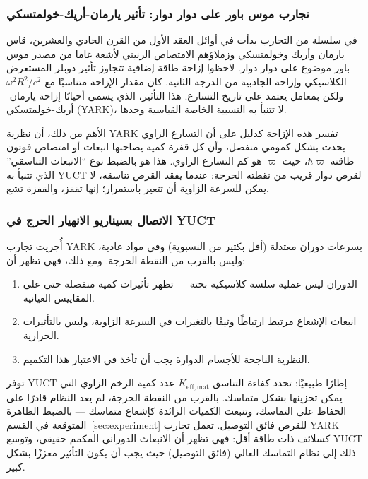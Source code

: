 \documentclass[12pt,a4paper]{article}
\begin{document}
	\subsubsection{تجارب موس باور على دوار دوار: تأثير يارمان-أريك-خولمتسكي}
	
	في سلسلة من التجارب بدأت في أوائل العقد الأول من القرن الحادي والعشرين، قاس يارمان وأريك وخولمتسكي وزملاؤهم الامتصاص الرنيني لأشعة غاما من مصدر موس باور موضوع على دوار دوار. لاحظوا إزاحة طاقة إضافية تتجاوز تأثير دوبلر المستعرض الكلاسيكي وإزاحة الجاذبية من الدرجة الثانية. كان مقدار الإزاحة متناسبًا مع \(\omega^2 R^2 / c^2\) ولكن بمعامل يعتمد على تاريخ التسارع. هذا التأثير، الذي يسمى أحيانًا إزاحة يارمان-أريك-خولمتسكي (YARK)، لا تتنبأ به النسبية الخاصة القياسية وحدها.
	
	الأهم من ذلك، أن نظرية YARK تفسر هذه الإزاحة كدليل على أن التسارع الزاوي يحدث بشكل كمومي منفصل، وأن كل قفزة كمية يصاحبها انبعاث أو امتصاص فوتون طاقته \(\hbar \varpi\)، حيث \(\varpi\) هو كم التسارع الزاوي. هذا هو بالضبط نوع ``الانبعاث التناسقي'' الذي تتنبأ به YUCT لقرص دوار قريب من نقطته الحرجة: عندما يفقد القرص تناسقه، لا يمكن للسرعة الزاوية أن تتغير باستمرار؛ إنها تقفز، والقفزة تشع.
	
	\subsubsection{الاتصال بسيناريو الانهيار الحرج في YUCT}
	
	أُجريت تجارب YARK بسرعات دوران معتدلة (أقل بكثير من النسبوية) وفي مواد عادية، وليس بالقرب من النقطة الحرجة. ومع ذلك، فهي تظهر أن:
	\begin{enumerate}
		\item الدوران ليس عملية سلسة كلاسيكية بحتة — تظهر تأثيرات كمية منفصلة حتى على المقاييس العيانية.
		\item انبعاث الإشعاع مرتبط ارتباطًا وثيقًا بالتغيرات في السرعة الزاوية، وليس بالتأثيرات الحرارية.
		\item النظرية الناجحة للأجسام الدوارة يجب أن تأخذ في الاعتبار هذا التكميم.
	\end{enumerate}
	
	توفر YUCT إطارًا طبيعيًا: تحدد كفاءة التناسق \(K_{\mathrm{eff,mat}}\) عدد كمية الزخم الزاوي التي يمكن تخزينها بشكل متماسك. بالقرب من النقطة الحرجة، لم يعد النظام قادرًا على الحفاظ على التماسك، وتنبعث الكميات الزائدة كإشعاع متماسك — بالضبط الظاهرة المتوقعة في القسم~\ref{sec:experiment} للقرص فائق التوصيل. تعمل تجارب YARK كسلائف ذات طاقة أقل: فهي تظهر أن الانبعاث الدوراني المكمم حقيقي، وتوسع YUCT ذلك إلى نظام التماسك العالي (فائق التوصيل) حيث يجب أن يكون التأثير معززًا بشكل كبير.
	
\end{document}
